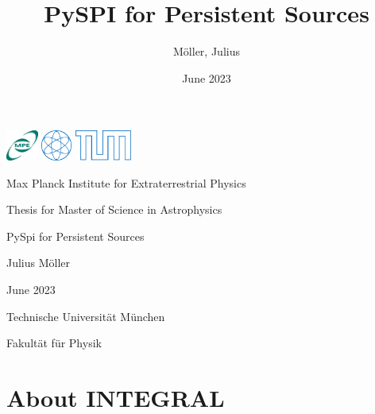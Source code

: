\documentclass{article}
\title{PySPI for Persistent Sources}
\author{Möller, Julius}
\date{June 2023}
\begin{document}
\begin{titlepage}
    
    \includegraphics[height=1cm]{Images/General/MPE_logo_189x180px.jpg}
    \hfill
    \includegraphics[height=1cm]{Images/General/PH.pdf}
    \includegraphics[height=1cm]{Images/General/tumlogo.pdf}

    \begin{center}
        \vspace{1cm}
        \large

        Max Planck Institute for Extraterrestrial Physics
        

        \vspace{1.5cm}
        \large
        Thesis for Master of Science in Astrophysics
        
        \vspace{3cm}
        \Huge
        PySpi for Persistent Sources
        
        \vspace{3cm}
        
        \LARGE
        Julius Möller
        
        \vspace{1.5cm}
        \large
        June 2023
        
        
        \vspace{6.5cm}
        
        
        
        \large
        Technische Universität München

        Fakultät für Physik
        
        
        
    \end{center}
\end{titlepage}


\tableofcontents

\pagebreak

\section{About INTEGRAL}
\end{document}
